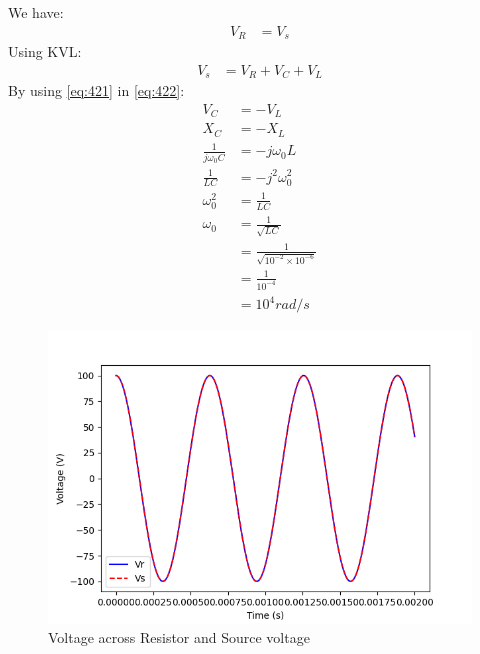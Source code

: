 \documentclass[journal,12pt,twocolumn]{IEEEtran}
\theoremstyle{remark}
\begin{document}


We have:
\begin{align}
    V_R&=V_s \label{eq:421}
\end{align}
Using KVL:
\begin{align}
    V_s&=V_R+V_C+V_L\label{eq:422}
\end{align}
By using \eqref{eq:421} in \eqref{eq:422}:
\begin{align}
    V_C&=-V_L\label{eq:423}\\
    X_C&=-X_L\label{eq:424}\\
    \frac{1}{j\omega_0C}&=-j\omega_0L\label{eq:425}\\
\frac{1}{LC} &= -j^2\omega_0^{2} \label{eq:426}\\ 
\omega_0^{2}&=\frac{1}{LC}\label{eq:427}\\
\omega_0&=\frac{1}{\sqrt{LC}} \label{eq:428}\\
&=\frac{1}{\sqrt{10^{-2}\times10^{-6}}}\label{eq:429}\\
&=\frac{1}{10^{-4}}\label{eq:4210}\\
&=10^4 rad/s\label{eq:4211}
\end{align}
\begin{figure}[h]
        \centering
\includegraphics[width=\columnwidth]{2023/BM/42/figs/Figure42.png}
    \caption{Voltage across Resistor and Source voltage}
    \label{fig:plot42}
\end{figure}
\end{document}
